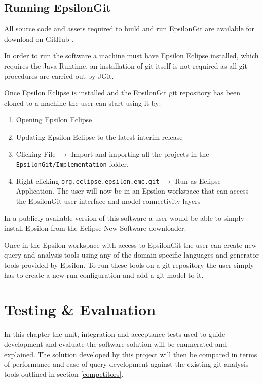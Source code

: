 \documentclass[11pt]{book}
\newcommand{\code}[1]{\texttt{#1}}
\begin{document}
\section{Running EpsilonGit}
All source code and assets required to build and run EpsilonGit are available for download on GitHub \cite{epsilongitgithub}. 

In order to run the software a machine must have Epsilon Eclipse \cite{epsilonhomepage} installed, which requires the Java Runtime, an installation of git itself is not required as all git procedures are carried out by JGit.

Once Epsilon Eclipse is installed and the EpsilonGit git repository has been cloned to a machine the user can start using it by:

\begin{enumerate}
	\item Opening Epsilon Eclipse
	\item Updating Epsilon Eclipse to the latest interim release
	\item Clicking File $\rightarrow
$ Import and importing all the projects in the \code{EpsilonGit/Implementation} folder.
	\item Right clicking \code{org.eclipse.epsilon.emc.git} $\rightarrow
$ Run as Eclipse Application. The user will now be in an Epsilon workspace that can access the EpsilonGit user interface and model connectivity layers
\end{enumerate}

In a publicly available version of this software a user would be able to simply install Epsilon from the Eclipse New Software downloader.

Once in the Epsilon workspace with access to EpsilonGit the user can create new query and analysis tools using any of the domain specific languages and generator tools provided by Epsilon. To run these tools on a git repository the user simply has to create a new run configuration and add a git model to it.


\chapter{Testing \& Evaluation}
\label{testeval}
In this chapter the unit, integration and acceptance tests used to guide development and evaluate the software solution will be enumerated and explained. The solution developed by this project will then be compared in terms of performance and ease of query development against the existing git analysis tools outlined in section \ref{competitors}.
\end{document}
